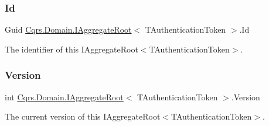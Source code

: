 \subsubsection{\texorpdfstring{Id}{Id}}
{\footnotesize\ttfamily Guid \hyperlink{interfaceCqrs_1_1Domain_1_1IAggregateRoot}{Cqrs.\+Domain.\+I\+Aggregate\+Root}$<$ T\+Authentication\+Token $>$.Id\hspace{0.3cm}{\ttfamily [get]}}



The identifier of this I\+Aggregate\+Root$<$\+T\+Authentication\+Token$>$. 

\mbox{\label{interfaceCqrs_1_1Domain_1_1IAggregateRoot_ad81adab68c0984330f735a1f5a661aa7_ad81adab68c0984330f735a1f5a661aa7}} 
\subsubsection{\texorpdfstring{Version}{Version}}
{\footnotesize\ttfamily int \hyperlink{interfaceCqrs_1_1Domain_1_1IAggregateRoot}{Cqrs.\+Domain.\+I\+Aggregate\+Root}$<$ T\+Authentication\+Token $>$.Version\hspace{0.3cm}{\ttfamily [get]}}



The current version of this I\+Aggregate\+Root$<$\+T\+Authentication\+Token$>$. 

